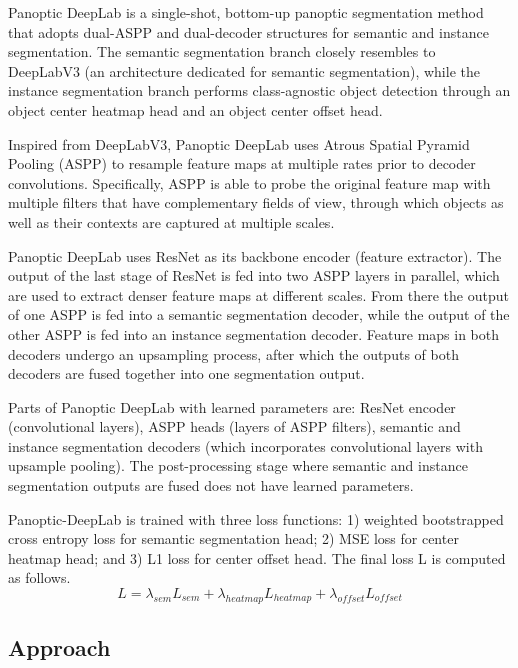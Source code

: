 \documentclass[10pt,twocolumn,letterpaper]{article}
\begin{document}
Panoptic DeepLab is a single-shot, bottom-up panoptic segmentation method that adopts dual-ASPP and dual-decoder structures for semantic and instance segmentation. The semantic segmentation branch closely resembles to DeepLabV3 (an architecture dedicated for semantic segmentation), while the instance segmentation branch performs class-agnostic object detection through an object center heatmap head and an object center offset head.

Inspired from DeepLabV3, Panoptic DeepLab uses Atrous Spatial Pyramid Pooling (ASPP) to resample feature maps at multiple rates prior to decoder convolutions. Specifically, ASPP is able to probe the original feature map with multiple filters that have complementary fields of view, through which objects as well as their contexts are captured at multiple scales. 

Panoptic DeepLab uses ResNet as its backbone encoder (feature extractor). The output of the last stage of ResNet is fed into two ASPP layers in parallel, which are used to extract denser feature maps at different scales. From there the output of one ASPP is fed into a semantic segmentation decoder, while the output of the other ASPP is fed into an instance segmentation decoder. Feature maps in both decoders undergo an upsampling process, after which the outputs of both decoders are fused together into one segmentation output. 

Parts of Panoptic DeepLab with learned parameters are: ResNet encoder (convolutional layers), ASPP heads (layers of ASPP filters), semantic and instance segmentation decoders (which incorporates convolutional layers with upsample pooling). The post-processing stage where semantic and instance segmentation outputs are fused does not have learned parameters.

Panoptic-DeepLab is trained with three loss functions: 1) weighted bootstrapped cross entropy loss for semantic segmentation head; 2) MSE loss for center heatmap
head; and 3) L1 loss for center offset head. The final loss L is computed as follows.
\[
L = \lambda_{sem} L_{sem} + \lambda_{heatmap} L_{heatmap} + \lambda_{offset} L_{offset}
\]

\subsection{Approach}

\end{document}
